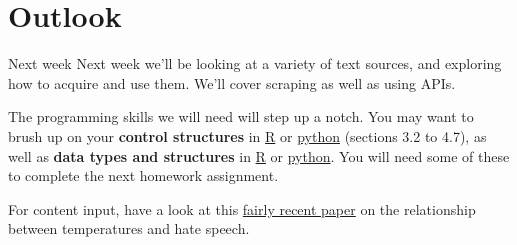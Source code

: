 \documentclass[
  10pt,
  ignorenonframetext,
  aspectratio=169]{beamer}
\newif\ifbibliography
\begin{document}
\hypertarget{outlook}{%
\section{Outlook}\label{outlook}}

\begin{frame}{Next week}
\protect\hypertarget{next-week}{}
Next week we'll be looking at a variety of text sources, and exploring
how to acquire and use them. We'll cover scraping as well as using APIs.

The programming skills we will need will step up a notch. You may want
to brush up on your \textbf{control structures} in
\href{https://www.r-bloggers.com/2019/06/how-to-use-if-else-statements-and-loops-in-r/}{R}
or
\href{https://docs.python.org/3/tutorial/introduction.html\#first-steps-towards-programming}{python}
(sections 3.2 to 4.7), as well as \textbf{data types and structures} in
\href{https://swcarpentry.github.io/r-novice-inflammation/13-supp-data-structures.html}{R}
or
\href{https://docs.python.org/3/tutorial/datastructures.html\#}{python}.
You will need some of these to complete the next homework assignment.

For content input, have a look at this
\href{https://www.thelancet.com/journals/lanplh/article/PIIS2542-5196(22)00173-5/fulltext}{fairly
recent paper} on the relationship between temperatures and hate speech.
\end{frame}

\begin{frame}[allowframebreaks]{}
  \bibliographytrue
  
\end{frame}
\end{document}
